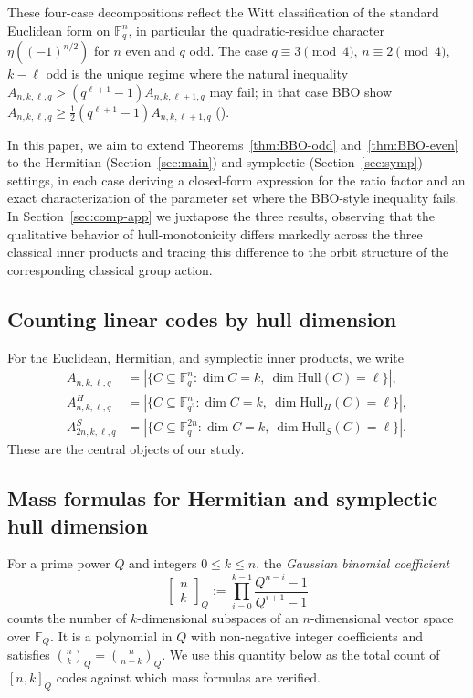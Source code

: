 \documentclass[11pt]{article}
\theoremstyle{plain}
\theoremstyle{remark}
\newcommand{\F}{\mathbb{F}}
\newcommand{\HHull}{\mathrm{Hull}_H}
\begin{document}
These four-case decompositions reflect the Witt classification of the standard
Euclidean form on $\F_q^n$, in particular the quadratic-residue character
$\eta((-1)^{n/2})$ for $n$ even and $q$ odd. The case $q \equiv 3 \pmod 4$,
$n \equiv 2 \pmod 4$, $k - \ell$ odd is the unique regime where the natural
inequality $A_{n,k,\ell,q} > (q^{\ell+1}-1) A_{n,k,\ell+1,q}$ may fail; in
that case BBO show $A_{n,k,\ell,q} \geq \tfrac{1}{2}(q^{\ell+1}-1) A_{n,k,\ell+1,q}$
(\cite[Theorem~12]{BBOz2026}).

In this paper, we aim to extend
Theorems~\ref{thm:BBO-odd} and~\ref{thm:BBO-even} to the Hermitian
(Section~\ref{sec:main}) and symplectic (Section~\ref{sec:symp}) settings,
in each case deriving a closed-form expression for the ratio factor and an
exact characterization of the parameter set where the BBO-style inequality fails.
In Section~\ref{sec:comp-app} we juxtapose the three results, observing
that the qualitative behavior of hull-monotonicity differs markedly across
the three classical inner products and tracing this difference to the orbit
structure of the corresponding classical group action.

\subsection{Counting linear codes by hull dimension}\label{sec:prelim-counts}

For the Euclidean, Hermitian, and symplectic inner products, we write
\begin{align*}
  A_{n,k,\ell,q}    &= |\{C \subseteq \F_q^n : \dim C = k,\ \dim \mathrm{Hull}(C) = \ell\}|, \\
  A^H_{n,k,\ell,q}  &= |\{C \subseteq \F_{q^2}^n : \dim C = k,\ \dim \HHull(C) = \ell\}|, \\
  A^S_{2n,k,\ell,q} &= |\{C \subseteq \F_q^{2n} : \dim C = k,\ \dim \mathrm{Hull}_S(C) = \ell\}|.
\end{align*}
These are the central objects of our study.

\subsection{Mass formulas for Hermitian and symplectic hull dimension}\label{sec:prelim-mass}

For a prime power $Q$ and integers $0 \leq k \leq n$, the
\emph{Gaussian binomial coefficient}
\[
  \begin{bmatrix} n \\ k \end{bmatrix}_Q
  := \prod_{i=0}^{k-1} \frac{Q^{n-i} - 1}{Q^{i+1} - 1}
\]
counts the number of $k$-dimensional subspaces of an $n$-dimensional vector
space over $\F_Q$. It is a polynomial in $Q$ with non-negative integer
coefficients and satisfies $\binom{n}{k}_Q = \binom{n}{n-k}_Q$. We use this
quantity below as the total count of $[n,k]_Q$ codes against which mass
formulas are verified.
\end{document}
